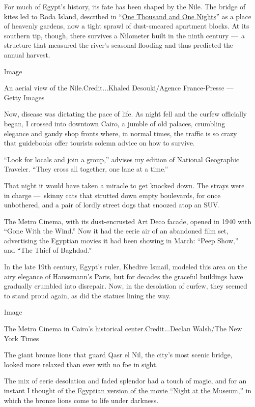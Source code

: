For much of Egypt's history, its fate has been shaped by the Nile. The
bridge of kites led to Roda Island, described in
``\href{https://www.britannica.com/topic/The-Thousand-and-One-Nights}{One
Thousand and One Nights}'' as a place of heavenly gardens, now a tight
sprawl of dust-smeared apartment blocks. At its southern tip, though,
there survives a Nilometer built in the ninth century ---~a structure
that measured the river's seasonal flooding and thus predicted the
annual harvest.

Image

An aerial view of the Nile.Credit...Khaled Desouki/Agence France-Presse
--- Getty Images

Now, disease was dictating the pace of life. As night fell and the
curfew officially began, I crossed into downtown Cairo, a jumble of old
palaces, crumbling elegance and gaudy shop fronts where, in normal
times, the traffic is so crazy that guidebooks offer tourists solemn
advice on how to survive.

``Look for locals and join a group,'' advises my edition of National
Geographic Traveler. ``They cross all together, one lane at a time.''

That night it would have taken a miracle to get knocked down. The strays
were in charge ---~skinny cats that strutted down empty boulevards, for
once unbothered, and a pair of lordly street dogs that snoozed atop an
SUV.

The Metro Cinema, with its dust-encrusted Art Deco facade, opened in
1940 with ``Gone With the Wind.'' Now it had the eerie air of an
abandoned film set, advertising the Egyptian movies it had been showing
in March: ``Peep Show,'' and ``The Thief of Baghdad.''

In the late 19th century, Egypt's ruler, Khedive Ismail, modeled this
area on the airy elegance of Haussmann's Paris, but for decades the
graceful buildings have gradually crumbled into disrepair. Now, in the
desolation of curfew, they seemed to stand proud again, as did the
statues lining the way.

Image

The Metro Cinema in Cairo's historical center.Credit...Declan Walsh/The
New York Times

The giant bronze lions that guard Qasr el Nil, the city's most scenic
bridge, looked more relaxed than ever with no foe in sight.

The mix of eerie desolation and faded splendor had a touch of magic, and
for an instant I thought of
\href{https://youtu.be/_CaAODL1XjM?t=5602}{the Egyptian version of the
movie ``Night at the Museum,''} in which the bronze lions come to life
under darkness.

